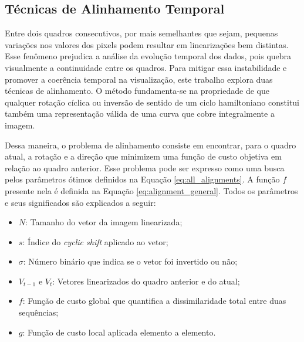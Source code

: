 \documentclass[12pt]{article}
\begin{document}
\subsection{Técnicas de Alinhamento Temporal} 

Entre dois quadros consecutivos, por mais semelhantes que sejam, pequenas variações nos valores dos pixels podem
resultar em linearizações bem distintas. Esse fenômeno prejudica a análise da evolução temporal dos dados, pois
quebra visualmente a continuidade entre os quadros. Para mitigar essa instabilidade e promover a coerência
temporal na visualização, este trabalho explora duas técnicas de alinhamento. O método fundamenta-se na propriedade
de que qualquer rotação cíclica ou inversão de sentido de um ciclo hamiltoniano constitui também uma representação válida
de uma curva que cobre integralmente a imagem.


Dessa maneira, o problema de alinhamento consiste em encontrar, para o quadro atual, a rotação e a direção que minimizem
uma função de custo objetiva em relação ao quadro anterior. Esse problema pode ser expresso como uma busca pelos 
parâmetros ótimos definidos na Equação \ref{eq:all_alignments}. A função $f$ presente nela é definida na Equação \ref{eq:alignment_general}.
Todos os parâmetros e seus significados são explicados a seguir:

\begin{itemize}
  \item $N$: Tamanho do vetor da imagem linearizada;
  \item $s$: Índice do \textit{cyclic shift} aplicado ao vetor;
  \item $\sigma$: Número binário que indica se o vetor foi invertido ou não;
  \item $V_{t-1} \text{ e } V_t$: Vetores linearizados do quadro anterior e do atual;
  \item $f$: Função de custo global que quantifica a dissimilaridade total entre duas sequências;
  \item $g$: Função de custo local aplicada elemento a elemento. 
\end{itemize}
\end{document}
